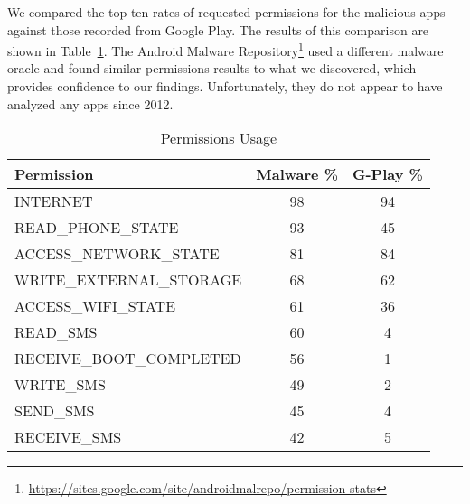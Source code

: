\documentclass{sig-alternate}
\begin{document}
We compared the top ten rates of requested permissions for the malicious apps against those recorded from Google Play. The results of this comparison are shown in Table~\ref{Table:permissions_usage}. The Android Malware Repository\footnote{\url{https://sites.google.com/site/androidmalrepo/permission-stats}} used a different malware oracle and found similar permissions results to what we discovered, which provides confidence to our findings. Unfortunately, they do not appear to have analyzed any apps since 2012.







\begin{table}[h]
\caption{Permissions Usage}
\label{Table:permissions_usage}
 \begin{tabular}{ | l | c | c | } \hline

  \bfseries Permission & \bfseries Malware \%& \bfseries G-Play \%\\ \hline

	INTERNET	& 98 &	94 \\ \hline
	READ\_PHONE\_STATE	& 93 &	45 \\ \hline
	ACCESS\_NETWORK\_STATE	 & 81 &	84 \\ \hline
	WRITE\_EXTERNAL\_STORAGE &	68 &	62 \\ \hline
	ACCESS\_WIFI\_STATE &	61 &	36 \\ \hline
	READ\_SMS &	60 & 	4 \\ \hline
	RECEIVE\_BOOT\_COMPLETED &	56 & 1 \\ \hline
	WRITE\_SMS &	49 &	2 \\ \hline
	SEND\_SMS &	45 &	4 \\ \hline
	RECEIVE\_SMS &	42 &	5 \\ \hline


  \end{tabular}
\end{table}
\end{document}
